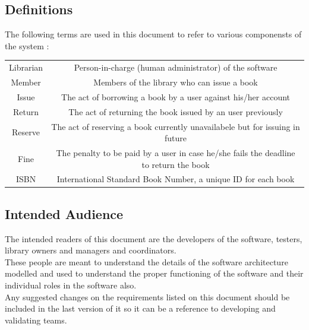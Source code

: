 \documentclass{article}
\begin{document}
\subsection{Definitions}
The following terms are used in this document to refer to various componensts of the system :\\

\begin{tabular}{ c| c }
 Librarian & Person-in-charge (human administrator) of the software\\
 Member & Members of the library who can issue a book\\
 Issue & The act of borrowing a book by a user against his/her account\\
 Return & The act of returning the book issued by an user previously \\
 Reserve & The act of reserving a book currently unavailabele but for issuing in future\\
 Fine & The penalty to be paid by a user in case he/she fails the deadline to return the book\\
 ISBN & International Standard Book Number, a unique ID for each book
\end{tabular}	

\subsection{Intended Audience}
The intended readers of this document are the developers of the software, testers, library owners
and managers and coordinators.\\
These people are meant to understand the details of the software architecture modelled and used to understand the proper functioning of the software and their individual roles in the software also.\\
Any suggested changes on the requirements listed on this document should be included in
the last version of it so it can be a reference to developing and validating teams.
\end{document}
